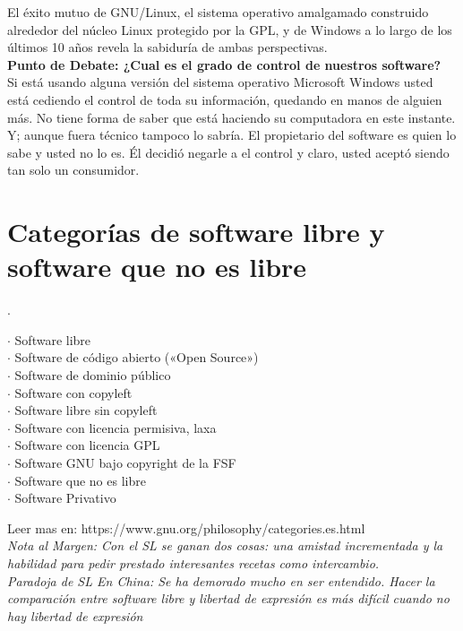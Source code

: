 El éxito mutuo de GNU/Linux, el sistema operativo amalgamado construido alrededor del núcleo
Linux protegido por la GPL, y de Windows a lo largo de los últimos 10 años revela la sabiduría de
ambas perspectivas.
\\
{\bf Punto de Debate: ¿Cual es el grado de control de nuestros software?}
\\
Si está usando alguna versión del sistema operativo Microsoft Windows usted está cediendo el control de toda su información, quedando en manos de alguien más. No tiene forma de saber que está haciendo su computadora en este instante.
\\
Y; aunque fuera  técnico tampoco lo sabría. El propietario del software es quien lo sabe y usted no lo es. 
Él decidió negarle a el control y claro, usted aceptó siendo tan solo un consumidor.

\section{Categorías de software libre y software que no es libre}
	.
\begin{description}
	\item[$\cdot$ Software libre]
	\item[$\cdot$ Software de código abierto («Open Source»)]
	\item[$\cdot$ Software de dominio público]
	\item[$\cdot$ Software con copyleft]
	\item[$\cdot$ Software libre sin copyleft]
	\item[$\cdot$ Software con licencia permisiva, laxa]
	\item[$\cdot$ Software con licencia GPL]
	\item[$\cdot$ Software GNU bajo copyright de la FSF]
	\item[$\cdot$ Software que no es libre]
	\item[$\cdot$ Software Privativo]
\end{description}

Leer mas en: https://www.gnu.org/philosophy/categories.es.html
\\
{\it
\emph{Nota al Margen:} Con el SL se ganan dos cosas: una amistad incrementada y la habilidad para pedir prestado interesantes recetas como intercambio.
\\
\emph{Paradoja de SL En China:}
Se ha demorado mucho en ser entendido. Hacer la comparación entre software libre y libertad de expresión es más difícil cuando no hay libertad de expresión
}
